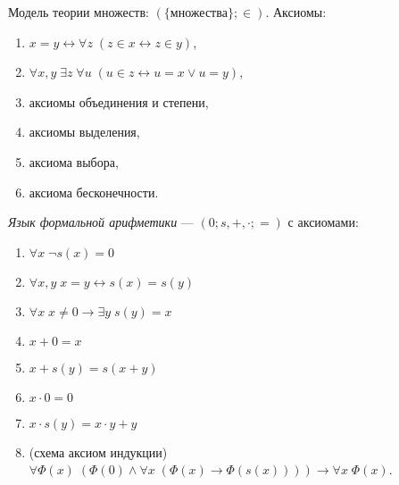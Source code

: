 \documentclass[12pt,a4paper]{article}
\begin{document}
    \begin{definition}
        Модель теории множеств: $(\{\text{множества}\}; {\in})$. Аксиомы:
        \begin{enumerate}
            \item $x = y \leftrightarrow \forall z\; (z \in x \leftrightarrow z \in y)$,
            \item $\forall x, y\; \exists z\; \forall u\; (u \in z \leftrightarrow u = x \vee u = y)$,
            \item аксиомы объединения и степени,
            \item аксиомы выделения,
            \item аксиома выбора,
            \item аксиома бесконечности.
        \end{enumerate}
    \end{definition}

    \begin{definition}
        \emph{Язык формальной арифметики} --- $(0; s, {+}, {\cdot}; {=})$ с аксиомами:
        \begin{enumerate}
            \item $\forall x\; \neg s(x) = 0$
            \item $\forall x, y\; x = y \leftrightarrow s(x) = s(y)$
            \item $\forall x\; x \neq 0 \rightarrow \exists y\; s(y) = x$
            \item $x + 0 = x$
            \item $x + s(y) = s(x + y)$
            \item $x \cdot 0 = 0$
            \item $x \cdot s(y) = x \cdot y + y$
            \item (схема аксиом индукции) $\forall \Phi(x)\; (\Phi(0) \wedge \forall x\; (\Phi(x) \rightarrow \Phi(s(x)))) \rightarrow \forall x\; \Phi(x)$.
        \end{enumerate}
    \end{definition}
\end{document}
